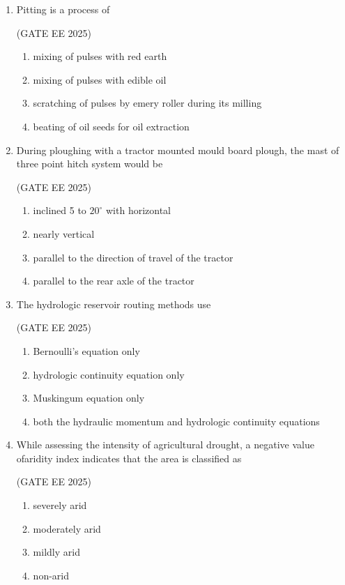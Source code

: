 \documentclass[journal,12pt,onecolumn]{IEEEtran}
\theoremstyle{remark}
\begin{document}
\begin{enumerate}
\item Pitting is a process of

\hfill(GATE EE 2025)

\begin{enumerate}
\item mixing of pulses with red earth
\item mixing of pulses with edible oil
\item scratching of pulses by emery roller during its milling
\item beating of oil seeds for oil extraction
\end{enumerate}

\item During ploughing with a tractor mounted mould board plough, the mast of
three point hitch system would be

\hfill(GATE EE 2025)

\begin{enumerate}
\item inclined 5 to $20^\circ$ with horizontal
\item nearly vertical
\item parallel to the direction of travel of the tractor
\item parallel to the rear axle of the tractor
\end{enumerate}

\item The hydrologic reservoir routing methods use

\hfill(GATE EE 2025)

\begin{enumerate}
\item Bernoulli's equation only
\item hydrologic continuity equation only
\item Muskingum equation only
\item both the hydraulic momentum and hydrologic continuity equations
\end{enumerate}


\item While assessing the intensity of agricultural drought, a negative value ofaridity index indicates that the area is classified as

\hfill(GATE EE 2025)

\begin{multicols}{4}
\begin{enumerate}
\item severely arid
\item moderately arid
\item mildly arid
\item non-arid
\end{enumerate}
\end{multicols}


\end{enumerate}
\end{document}

